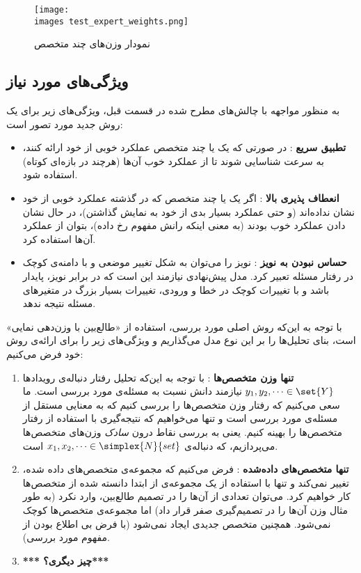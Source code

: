 \begin{figure}[h!]
\texttt{[image: \\images test\_expert\_weights.png]}
\caption{
نمودار وزن‌های چند متخصص
}
\label{fig:wmstatic}
\end{figure}




\subsection{
ویژگی‌های مورد نیاز
} 
به منظور مواجهه با چالش‌های مطرح شده در قسمت قبل، ویژگی‌های زیر برای یک روش جدید مورد تصور است:
\begin{itemize}
\item \textbf{
تطبیق سریع
}: 
در صورتی که یک یا چند متخصص عملکرد خوبی از خود ارائه کنند، به سرعت شناسایی شوند تا از عملکرد خوب آن‌ها (هرچند در بازه‌ای کوتاه) استفاده شود.
\item \textbf{
انعطاف پذیری بالا
}: 
اگر یک یا چند متخصص که در گذشته عملکرد خوبی از خود نشان نداده‌اند (و حتی عملکرد بسیار بدی از خود به نمایش گذاشتن)، در حال نشان دادن عملکرد خوب بودند (به معنی اینکه رانش مفهوم رخ داده)، بتوان از عملکرد آن‌ها استفاده کرد.

\item \textbf{
حساس نبودن به نویز
}: 
نویز را می‌توان به شکل تغییر موضعی و با دامنه‌ی کوچک در رفتار مسئله تعبیر کرد. مدل پیش‌نهادی نیازمند این است که در برابر نویز، پایدار باشد و با تغییرات کوچک در خطا و ورودی، تغییرات بسیار بزرگ در متغیرهای مسئله نتیجه ندهد.

\end{itemize}

با توجه به این‌که روش اصلی مورد بررسی، استفاده از «طالع‌بین با وزن‌دهی نمایی» است، بنای تحلیل‌ها را بر این نوع مدل می‌گذاریم و ویژگی‌های زیر را برای ارائه‌ی روش خود فرض می‌کنیم:
\begin{enumerate}
\item \textbf{
تنها وزن متخصص‌ها
}: 
با توجه به این‌که تحلیل رفتار دنباله‌ی رویدادها 
$y_1, y_2, \cdots \in \set{Y}$ 
نیازمند دانش نسبت به مسئله‌ی مورد بررسی است. ما سعی می‌کنیم که رفتار وزن متخصص‌ها را بررسی کنیم که به معنایی مستقل از مسئله‌ی مورد بررسی است و تنها می‌خواهیم که نتیجه‌گیری با استفاده از رفتار متخصص‌ها را بهینه کنیم. یعنی به بررسی نقاط درون 
\textit{
سادک
} 
وزن‌های متخصص‌ها می‌پردازیم، که دنباله‌ی 
$x_1, x_2, \cdots \in \simplex{N}{set} $ 
است.

\item \textbf{
تنها متخصص‌های داده‌شده
}: 
فرض می‌کنیم که مجموعه‌ی متخصص‌های داده شده، تغییر نمی‌کند و تنها با استفاده از یک مجموعه‌ی از ابتدا دانسته شده از متخصص‌ها کار خواهیم کرد. می‌توان تعدادی از آن‌ها را در تصمیم طالع‌بین، وارد نکرد (به طور مثال وزن آن‌ها را در تصمیم‌گیری صفر قرار داد) اما مجموعه‌ی متخصص‌ها کوچک نمی‌شود. همچنین متخصص جدیدی ایجاد نمی‌شود (با فرض بی اطلاع بودن از مفهوم مورد بررسی).

\item \textbf{
*** چیز دیگری؟***
}

\end{enumerate}

